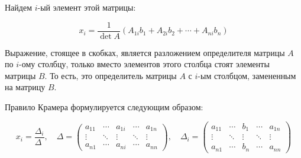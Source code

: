Найдем $i$-ый элемент этой матрицы:

$$
x_i = \frac1{\det A}\left(A_{1i}b_1+A_{2i}b_2+\cdots+A_{ni}b_n\right)
$$

Выражение, стоящее в скобках, является разложением определителя матрицы
$A$ по $i$-ому столбцу, только вместо элементов этого столбца стоят
элементы матрицы $B$. То есть, это определитель матрицы $A$ с $i$-ым
столбцом, замененным на матрицу $B$.

Правило Крамера формулируется следующим образом:

$$
x_i = \frac{\Delta_i}{\Delta_{\phantom{i}}},\quad
\Delta=
\begin{pmatrix}
a_{11} & \cdots & a_{1i} & \cdots & a_{1n} \\
\vdots & \ddots & \vdots & \ddots & \vdots \\
a_{n1} & \cdots & a_{ni} & \cdots & a_{nn}
\end{pmatrix}
,\quad
\Delta_i=\begin{pmatrix}
a_{11} & \cdots & b_1    & \cdots & a_{1n} \\
\vdots & \ddots & \vdots & \ddots & \vdots \\
a_{n1} & \cdots & b_n    & \cdots & a_{nn}
\end{pmatrix}
$$
    
